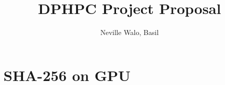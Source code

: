 \documentclass[a4paper]{article}
\author{Neville Walo, Basil}
\title {DPHPC Project Proposal}
\begin{document}
\parindent 0pt
\maketitle

\part*{SHA-256 on GPU}
\end{document}
